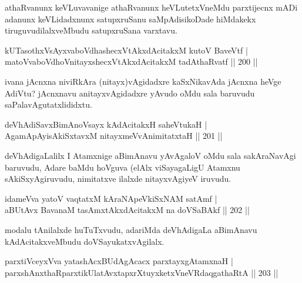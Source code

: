 \begin{artha}
athaRvanunx keVLuvavanige athaRvanunx heVLutetxVneMdu parxtijecnx mADi adanunx keVLidadxnunx satupxruSanu saMpAdisikoDade hiMdakekx tiruguvudilalxveMbudu satupxruSana varxtavu.
\end{artha}

\begin{shl}
kUTasothxV\s sAyxvaboVdhashecxVtAkxdAcitakxM kutoV BaveVtf |\\
matoV\s vaboVdhoV\s nitayxshecxVtAkxdAcitakxM tadA\s thaRvatf \hfill || 200 ||
\end{shl}

\begin{artha}
ivana jAcnxna niviRkAra (nitayx)vAgidadxre kaSxNikavAda jAcnxna heVge AdiVtu? jAcnxnavu anitayxvAgidadxre yAvudo oMdu sala baruvudu saPalavAgutatxlididxtu.
\end{artha}

\begin{shl}
deVhAdiSavxBimAnoV\s sayx kAdAcitakxH saheVtukaH |\\
AgamApAyisAkiSxtavxM nitayxmeVvAnimitatxtaH \hfill || 201 ||
\end{shl}


\begin{artha}
deVhAdigaLalilx I Atamxnige aBimAnavu yAvAgaloV oMdu sala sakAraNavAgi baruvudu, Adare baMdu hoVguva (elAlx viSayagaLigU Atamxnu sAkiSxyAgiruvudu, nimitatxve ilalxde nitayxvAgiyeV iruvudu.
\end{artha}

\begin{shl}
idameVva yatoV vaqtatxM kAraNApeVkiSxNAM satAmf |\\
aBUtAvx BavanaM tasAmxtAkxdAcitakxM na doVSaBAkf \hfill || 202 ||
\end{shl}


\begin{artha}
modalu tAnilalxde huTuTxvudu, adariMda deVhAdigaLa aBimAnavu kAdAcitakxveMbudu doVSayukatxvAgilalx.
\end{artha}

\begin{shl}
parxtiVceyxVva yatashAcxBUdAgAcacx parxtayxgAtamxnaH |\\
parxshAnxthaRparxtikUlatAvxtapxrXtuyxketxVneVRdaqgathaRtA \hfill || 203 ||
\end{shl}

